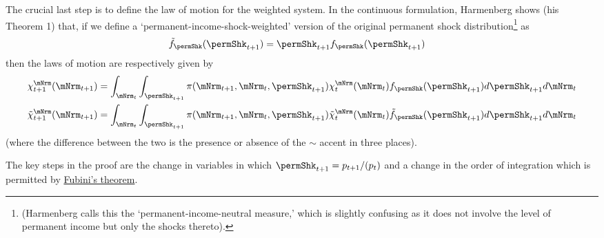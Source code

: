 \documentclass[\econtexRoot/BufferStockTheory]{subfiles}
\begin{document}
The crucial last step is to define the law of motion for the weighted system.
In the continuous formulation, Harmenberg shows (his Theorem 1) that, if we define a `permanent-income-shock-weighted' version of the original permanent shock distribution\footnote{(Harmenberg calls this the `permanent-income-neutral measure,' which is slightly confusing as it does not involve the level of permanent income but only the shocks thereto).} as
\begin{equation}\begin{gathered}\begin{aligned}
  \permShkWgtPrb(\permShkPrbNxt) & = \permShkPrbNxt \permShkRawPrb(\permShkPrbNxt)
\end{aligned}\end{gathered}\end{equation}
then the laws of motion are respectively given by 
\begin{equation}\begin{aligned}
  \mpPrbMargRaw_{t+1}(\mNrmNxt) & = \int_{\mNrmNow} \int_{\permShkPrbNxt} \lomdkPrb(\mNrmNxt,\mNrmNow,\permShkPrbNxt) \mpPrbMargRaw_{t}(\mNrmNow) \permShkRawPrb(\permShkPrbNxt) d \permShkPrbNxt d \mNrmNow
  \\
  \mpPrbMargWgt_{t+1}(\mNrmNxt) & = \int_{\mNrmNow} \int_{\permShkPrbNxt} \lomdkPrb(\mNrmNxt,\mNrmNow,\permShkPrbNxt) \mpPrbMargWgt_{t}(\mNrmNow) \permShkWgtPrb(\permShkPrbNxt) d \permShkPrbNxt d \mNrmNow
\end{aligned}\end{equation}
(where the difference between the two is the presence or absence of the $\sim$ accent in three places).

The key steps in the proof are the change in variables in which $\permShk_{t+1}=\permLvlNxt/(\PermGroFac \permLvlNow)$ and a change in the order of integration which is permitted by \href{https://en.wikipedia.org/wiki/Fubini\%27s_theorem}{Fubini's theorem}.
\end{document}
